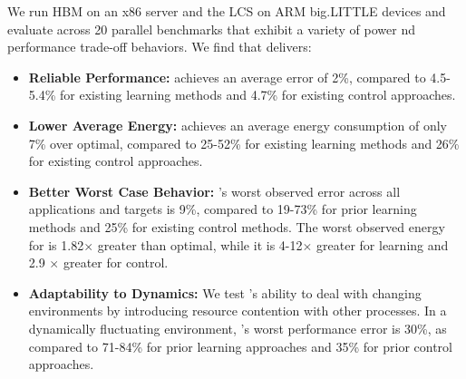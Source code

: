 


We run HBM on an x86 server and the LCS on ARM big.LITTLE
devices and evaluate across 20 parallel benchmarks that exhibit a variety of power nd performance trade-off behaviors.  We find that \SYSTEM{} delivers:
\begin{itemize}
\item \textbf{Reliable Performance: } \SYSTEM{} achieves an average error of 2\%,
  compared to 4.5-5.4\% for existing learning methods and 4.7\% for
  existing control approaches.
\item \textbf{Lower Average Energy:} \SYSTEM{} achieves an average energy consumption of  only 7\%
  over optimal, compared to 25-52\% for existing learning
  methods and 26\% for existing control approaches.
\item \textbf{Better Worst Case Behavior:}  \SYSTEM{}'s worst observed error across all
  applications and targets is 9\%, compared to 19-73\% for prior
  learning methods and 25\% for existing control methods.  The worst
  observed energy for \SYSTEM{} is 1.82$\times$ greater than optimal,
  while it is 4-12$\times$ greater for learning and 2.9 $\times$
  greater for control.
\item \textbf{Adaptability to Dynamics:} We test \SYSTEM{}'s ability to deal
  with changing environments by introducing resource contention with other processes.  In a dynamically fluctuating environment, \SYSTEM{}'s worst performance error is 30\%, as compared to
  71-84\% for prior learning approaches and 35\% for prior control
  approaches.
\end{itemize}

